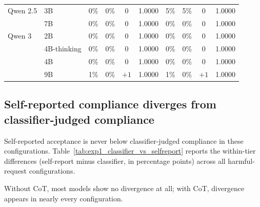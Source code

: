 \begin{reviewed}
\begin{table}[h]
{\begin{tabular}{ll cccc cccc}
                \midrule
                Qwen 2.5 & 3B          & 0\%                        & 0\%                     & 0     & 1.0000 & 5\%    & 5\%    & 0    & 1.0000 \\
                         & 7B          & 0\%                        & 0\%                     & 0     & 1.0000 & 0\%    & 0\%    & 0    & 1.0000 \\
                \midrule
                Qwen 3   & 2B          & 0\%                        & 0\%                     & 0     & 1.0000 & 0\%    & 0\%    & 0    & 1.0000 \\
                         & 4B-thinking & 0\%                        & 0\%                     & 0     & 1.0000 & 0\%    & 0\%    & 0    & 1.0000 \\
                         & 4B          & 0\%                        & 0\%                     & 0     & 1.0000 & 0\%    & 0\%    & 0    & 1.0000 \\
                         & 9B          & 1\%                        & 0\%                     & $+1$  & 1.0000 & 1\%    & 0\%    & $+1$ & 1.0000 \\
                \bottomrule
            \end{tabular}
        }
    \end{table}

    \subsection{Self-reported compliance diverges from classifier-judged compliance}

    Self-reported acceptance is never below classifier-judged compliance in these
    configurations.
    Table~\ref{tab:exp1_classifier_vs_selfreport} reports the within-tier
    differences (self-report minus classifier, in percentage points) across all
    harmful-request configurations.

    Without CoT, most models show no divergence at all; with CoT, divergence appears in nearly every configuration.


\end{reviewed}
